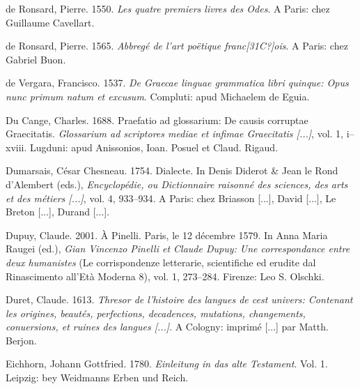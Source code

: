 \begin{styleStandard}
de Ronsard, Pierre. 1550. \textit{Les quatre premiers livres des Odes}. A Paris: chez Guillaume Cavellart.
\end{styleStandard}

\begin{styleStandard}
de Ronsard, Pierre. 1565. \textit{Abbregé de l’art poëtique franc[31C?]ois}. A Paris: chez Gabriel Buon.
\end{styleStandard}

\begin{styleStandard}
de Vergara, Francisco. 1537. \textit{De Graecae linguae grammatica libri quinque: Opus nunc primum natum et excusum}. Compluti: apud Michaelem de Eguia.
\end{styleStandard}

\begin{styleStandard}
Du Cange, Charles. 1688. Praefatio ad glossarium: De causis corruptae Graecitatis. \textit{Glossarium ad scriptores mediae et infimae Graecitatis [...]}, vol. 1, i–xviii. Lugduni: apud Anissonios, Ioan. Posuel et Claud. Rigaud.
\end{styleStandard}

\begin{styleStandard}
Dumarsais, César Chesneau. 1754. Dialecte. In Denis Diderot \& Jean le Rond d’Alembert (eds.), \textit{Encyclopédie, ou Dictionnaire raisonné des sciences, des arts et des métiers [...]}, vol. 4, 933–934. A Paris: chez Briasson [...], David [...], Le Breton [...], Durand [...].
\end{styleStandard}

\begin{styleStandard}
Dupuy, Claude. 2001. À Pinelli. Paris, le 12 décembre 1579. In Anna Maria Raugei (ed.), \textit{Gian Vincenzo Pinelli et Claude Dupuy: Une correspondance entre deux humanistes} (Le corrispondenze letterarie, scientifiche ed erudite dal Rinascimento all’Età Moderna 8), vol. 1, 273–284. Firenze: Leo S. Olschki.
\end{styleStandard}

\begin{styleStandard}
Duret, Claude. 1613. \textit{Thresor de l’histoire des langues de cest univers: Contenant les origines, beautés, perfections, decadences, mutations, changements, conuersions, et ruines des langues [...]}. A Cologny: imprimé [...] par Matth. Berjon.
\end{styleStandard}

\begin{styleStandard}
Eichhorn, Johann Gottfried. 1780. \textit{Einleitung in das alte Testament}. Vol. 1. Leipzig: bey Weidmanns Erben und Reich.
\end{styleStandard}

